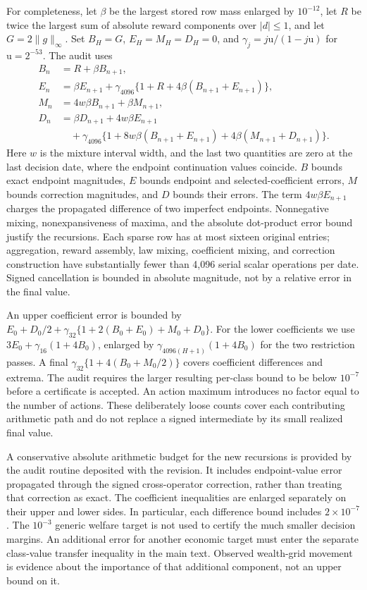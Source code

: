 For completeness, let $\beta$ be the largest stored row mass enlarged by $10^{-12}$, let $R$ be twice the largest sum of absolute reward components over $|d|\leq1$, and let $G=2\|g\|_\infty$. Set $B_H=G$, $E_H=M_H=D_H=0$, and $\gamma_j=j\mathrm u/(1-j\mathrm u)$ for $\mathrm u=2^{-53}$. The audit uses
\begin{align*}
 B_n&=R+\beta B_{n+1},\\
 E_n&=\beta E_{n+1}+\gamma_{4096}\{1+R+4\beta(B_{n+1}+E_{n+1})\},\\
 M_n&=4w\beta B_{n+1}+\beta M_{n+1},\\
 D_n&=\beta D_{n+1}+4w\beta E_{n+1}\\
 &\quad+\gamma_{4096}\{1+8w\beta(B_{n+1}+E_{n+1})
                         +4\beta(M_{n+1}+D_{n+1})\}.
\end{align*}
Here $w$ is the mixture interval width, and the last two quantities are zero at the last decision date, where the endpoint continuation values coincide. $B$ bounds exact endpoint magnitudes, $E$ bounds endpoint and selected-coefficient errors, $M$ bounds correction magnitudes, and $D$ bounds their errors. The term $4w\beta E_{n+1}$ charges the propagated difference of two imperfect endpoints. Nonnegative mixing, nonexpansiveness of maxima, and the absolute dot-product error bound justify the recursions. Each sparse row has at most sixteen original entries; aggregation, reward assembly, law mixing, coefficient mixing, and correction construction have substantially fewer than 4,096 serial scalar operations per date. Signed cancellation is bounded in absolute magnitude, not by a relative error in the final value.

An upper coefficient error is bounded by $E_0+D_0/2+\gamma_{32}\{1+2(B_0+E_0)+M_0+D_0\}$. For the lower coefficients we use $3E_0+\gamma_{16}(1+4B_0)$, enlarged by $\gamma_{4096(H+1)}(1+4B_0)$ for the two restriction passes. A final $\gamma_{32}\{1+4(B_0+M_0/2)\}$ covers coefficient differences and extrema. The audit requires the larger resulting per-class bound to be below $10^{-7}$ before a certificate is accepted. An action maximum introduces no factor equal to the number of actions. These deliberately loose counts cover each contributing arithmetic path and do not replace a signed intermediate by its small realized final value.

A conservative absolute arithmetic budget for the new recursions is provided by the audit routine deposited with the revision. It includes endpoint-value error propagated through the signed cross-operator correction, rather than treating that correction as exact. The coefficient inequalities are enlarged separately on their upper and lower sides. In particular, each difference bound includes $2\times10^{-7}$. The $10^{-3}$ generic welfare target is not used to certify the much smaller decision margins. An additional error for another economic target must enter the separate class-value transfer inequality in the main text. Observed wealth-grid movement is evidence about the importance of that additional component, not an upper bound on it.

